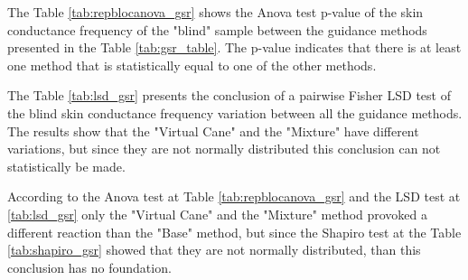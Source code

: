The Table \ref{tab:repblocanova_gsr} shows the Anova test p-value of the skin conductance frequency of the "blind" sample between the guidance methods presented in the Table \ref{tab:gsr_table}. The p-value indicates that there is at least one method that is statistically equal to one of the other methods.



The Table \ref{tab:lsd_gsr} presents the conclusion of a pairwise Fisher LSD test of the blind skin conductance frequency variation between all the guidance methods. The results show that the "Virtual Cane" and the "Mixture" have different variations, but since they are not normally distributed this conclusion can not statistically be made.



According to the Anova test at Table \ref{tab:repblocanova_gsr} and the LSD test at \ref{tab:lsd_gsr} only the "Virtual Cane" and the "Mixture" method provoked a different reaction than the "Base" method, but since the Shapiro test at the Table \ref{tab:shapiro_gsr} showed that they are not normally distributed, than this conclusion has no foundation.

\FloatBarrier

